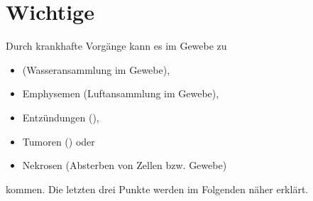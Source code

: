 \bigskip

\section{Wichtige }


\Text{{\TxBeschreibung}}
{%
Durch krankhafte Vorgänge kann es im Gewebe zu
\begin{itemize}
    \item {} (Wasseransammlung im
    Gewebe),
    \item Emphysemen (Luftansammlung im Gewebe),
    \item Entzündungen (),
    \item Tumoren () oder
    \item Nekrosen (Absterben von Zellen bzw. Gewebe)
\end{itemize}
kommen. Die letzten drei Punkte werden im Folgenden näher
erklärt.
}
%



